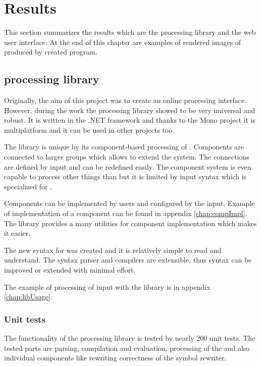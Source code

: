 
\chapter{Results}

This section summarizes the results which are the \lsystem processing library and the web user interface.
At the end of this chapter are examples of rendered images of \lsystems produced by created program.


\section{\lsystem processing library}

Originally, the aim of this project was to create an online \lsystem processing interface.
However, during the work the \lsystem processing library showed to be very universal and robust.
It is written in the .NET framework and thanks to the Mono project it is multiplatform and it can be used in other projects too.

The library is unique by its component-based processing of \lsystems.
Components are connected to larger groups which allows to extend the system.
The connections are defined by input and can be redefined easily.
The component system is even capable to process other things than \lsystems but it is limited by input syntax which is specialized for \lsystems.

Components can be implemented by users and configured by the input.
Example of implementation of a component can be found in appendix \ref{chap:compImpl}.
The library provides a many utilities for component implementation which makes it easier.

The new syntax for \lsystems was created and it is relatively simple to read and understand.
The syntax parser and compilers are extensible, thus syntax can be improved or extended with minimal effort.

The example of processing of input with the library is in appendix \ref{chap:libUsage}.


\subsection{Unit tests}

The functionality of the \lsystem processing library is tested by nearly 200 unit tests.
The tested parts are parsing, compilation and evaluation, processing of the \lsystems and also individual components like rewriting correctness of the symbol rewriter.

